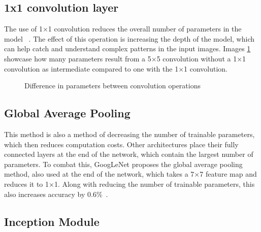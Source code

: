 \subsection{1x1 convolution layer}

The use of 1$\times$1 convolution reduces the overall number of parameters in the model ~\cite{link17}. The effect of this operation is increasing the depth of the model, which can help catch and understand complex patterns in the input images. Images \ref{fig:fig42} showcase how many parameters result from a 5$\times$5 convolution without a 1$\times$1 convolution as intermediate compared to one with the 1$\times$1 convolution. 

\begin{figure}[H]
    \caption{Difference in parameters between convolution operations}
    \label{fig:fig42}
\end{figure}

\subsection{Global Average Pooling}

This method is also a method of decreasing the number of trainable parameters, which then reduces computation costs. Other architectures place their fully connected layers at the end of the network, which contain the largest number of parameters. To combat this, GoogLeNet proposes the global average pooling method, also used at the end of the network, which takes a 7$\times$7 feature map and reduces it to 1$\times$1. Along with reducing the number of trainable parameters, this also increases accuracy by 0.6\%~\cite{link17}. 

\subsection{Inception Module}

